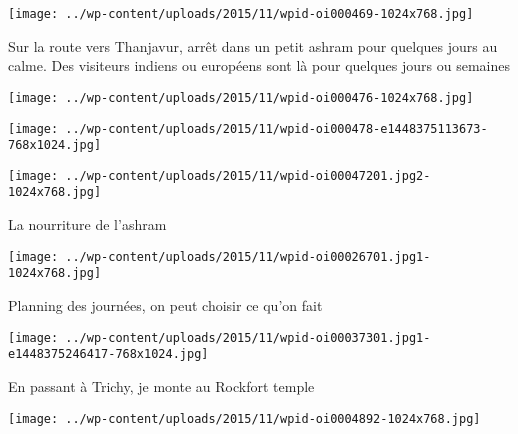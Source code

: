  

\begin{center} \texttt{[image: ../wp-content/uploads/2015/11/wpid-oi000469-1024x768.jpg]} \end{center}

 

 Sur la route vers Thanjavur, arrêt dans un petit ashram pour quelques jours au calme. Des visiteurs indiens ou européens sont là pour quelques jours ou semaines 

 

\begin{center} \texttt{[image: ../wp-content/uploads/2015/11/wpid-oi000476-1024x768.jpg]} \end{center}

 

 

\begin{center} \texttt{[image: ../wp-content/uploads/2015/11/wpid-oi000478-e1448375113673-768x1024.jpg]} \end{center}

 

 

\begin{center} \texttt{[image: ../wp-content/uploads/2015/11/wpid-oi00047201.jpg2-1024x768.jpg]} \end{center}

 

 La nourriture de l'ashram 

 

\begin{center} \texttt{[image: ../wp-content/uploads/2015/11/wpid-oi00026701.jpg1-1024x768.jpg]} \end{center}

 

 Planning des journées, on peut choisir ce qu'on fait 

 

\begin{center} \texttt{[image: ../wp-content/uploads/2015/11/wpid-oi00037301.jpg1-e1448375246417-768x1024.jpg]} \end{center}

 

 En passant à Trichy, je monte au Rockfort temple 

 

\begin{center} \texttt{[image: ../wp-content/uploads/2015/11/wpid-oi0004892-1024x768.jpg]} \end{center}


